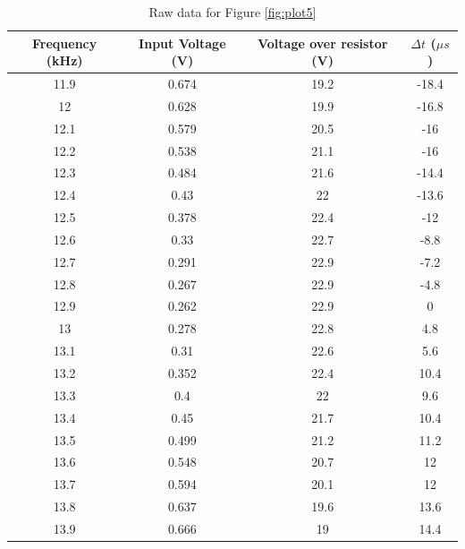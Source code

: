 \documentclass{article}
\begin{document}
\begin{table}[H]
    \centering
    \begin{tabular}{c|c|c|c}
        Frequency (kHz) & Input Voltage (V) & Voltage over resistor (V) &
        $\Delta t$ ($\mu s$) \\
        \hline
        11.9	&	0.674	&	19.2	&	-18.4	\\
        12	&	0.628	&	19.9	&	-16.8	\\
        12.1	&	0.579	&	20.5	&	-16	\\
        12.2	&	0.538	&	21.1	&	-16	\\
        12.3	&	0.484	&	21.6	&	-14.4	\\
        12.4	&	0.43	&	22	&	-13.6	\\
        12.5	&	0.378	&	22.4	&	-12	\\
        12.6	&	0.33	&	22.7	&	-8.8	\\
        12.7	&	0.291	&	22.9	&	-7.2	\\
        12.8	&	0.267	&	22.9	&	-4.8	\\
        12.9	&	0.262	&	22.9	&	0	\\
        13	&	0.278	&	22.8	&	4.8	\\
        13.1	&	0.31	&	22.6	&	5.6	\\
        13.2	&	0.352	&	22.4	&	10.4	\\
        13.3	&	0.4	&	22	&	9.6	\\
        13.4	&	0.45	&	21.7	&	10.4	\\
        13.5	&	0.499	&	21.2	&	11.2	\\
        13.6	&	0.548	&	20.7	&	12	\\
        13.7	&	0.594	&	20.1	&	12	\\
        13.8	&	0.637	&	19.6	&	13.6	\\
        13.9	&	0.666	&	19	&	14.4	
    \end{tabular}
    \caption{Raw data for Figure \ref{fig:plot5}}
    \label{fig:t5}
\end{table}
\end{document}
